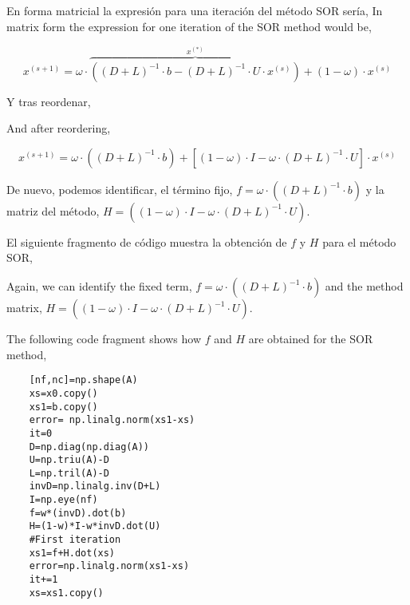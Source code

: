 \begin{paracol}{2}
En forma matricial la expresión para una iteración del método SOR sería,
\switchcolumn
In matrix form the expression for one iteration of the SOR method would be,
\end{paracol}
\begin{equation*}
x^{(s+1)}= \omega\cdot\overbrace{\left((D+L)^{-1}\cdot b-(D+L)^{-1}\cdot U\cdot x^{(s)}\right)}^{x^{(*)}}+(1-\omega)\cdot x^{(s)}
\end{equation*}
\begin{paracol}{2}

Y tras reordenar,

\switchcolumn
And after reordering,

\end{paracol}

\begin{equation*}
x^{(s+1)}= \omega\cdot\left((D+L)^{-1}\cdot b\right)+\left[(1-\omega)\cdot I-\omega\cdot(D+L)^{-1}\cdot U\right]\cdot x^{(s)}
\end{equation*}

\begin{paracol}{2}
De nuevo, podemos identificar, el término fijo, $f=\omega\cdot\left((D+L)^{-1}\cdot b\right)$ y la matriz del método, $H=\left((1-\omega)\cdot I-\omega\cdot(D+L)^{-1}\cdot U\right)$.

El siguiente fragmento de código muestra la obtención de $f$ y $H$ para el método SOR,

\switchcolumn

Again, we can identify the fixed term, $f=\omega\cdot\left((D+L)^{-1}\cdot b\right)$ and the method matrix, $H=\left((1-\omega)\cdot I-\omega\cdot(D+L)^{-1}\cdot U\right)$.

The following code fragment shows how $f$ and $H$ are obtained for the SOR method,    
\end{paracol}

\begin{verbatim}
    [nf,nc]=np.shape(A)
    xs=x0.copy()
    xs1=b.copy()
    error= np.linalg.norm(xs1-xs)
    it=0
    D=np.diag(np.diag(A))
    U=np.triu(A)-D
    L=np.tril(A)-D
    invD=np.linalg.inv(D+L)
    I=np.eye(nf)
    f=w*(invD).dot(b)
    H=(1-w)*I-w*invD.dot(U)
    #First iteration
    xs1=f+H.dot(xs)
    error=np.linalg.norm(xs1-xs)
    it+=1
    xs=xs1.copy()
    
\end{verbatim}

